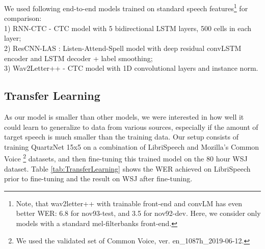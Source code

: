 \documentclass{article}
\begin{document}
We used following end-to-end models trained on standard speech features\footnote{Note, that wav2letter++ \cite{zeghidour2018b} with trainable front-end and convLM has even better WER: 6.8 for nov93-test, and 3.5 for nov92-dev. Here, we consider only models with a standard mel-filterbanks front-end.}
for comparison:\\
1) RNN-CTC \cite{Graves2014} -  CTC model with 5 bidirectional LSTM layers, 500 cells in each layer;\\
2) ResCNN-LAS \cite{Chorowski2016}: Listen-Attend-Spell model with deep residual convLSTM encoder and LSTM decoder + label smoothing;\\
3) Wav2Letter++ \cite{zeghidour2018b} - CTC model with 1D convolutional layers and instance norm.


\begin{table}[thb]
\centering
\caption{QuartzNet-5x3, WSJ, WER(\%)}
\vspace{4pt}
\label{tab:WSJ}
\end{table}

\subsection{Transfer Learning}
As our model is smaller than other models, we were interested in how well it could learn to generalize to data from various sources, especially if the amount of target speech is much smaller than the training data. Our setup consists of training QuartzNet 15x5 on a combination of LibriSpeech \cite{panayotov2015librispeech} and Mozilla's Common Voice \cite{CommonVoice}\footnote{We used the validated set of Common Voice, ver. en\_1087h\_2019-06-12.} datasets, and then fine-tuning this trained model on the 80 hour WSJ dataset.  Table \ref{tab:TransferLearning} shows the WER achieved on LibriSpeech prior to fine-tuning and the result on WSJ after fine-tuning.
\end{document}
